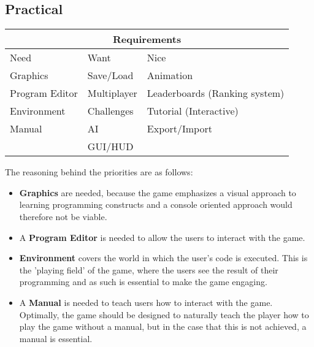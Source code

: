 \subsection*{Practical}
\begin{tabular}{|l|l|l|}
\hline
\multicolumn{3}{|c|}{Requirements}\\
\hline
Need & Want & Nice\\
\hline
Graphics & Save/Load & Animation\\
Program Editor & Multiplayer & Leaderboards (Ranking system)\\
Environment & Challenges & Tutorial (Interactive)\\
Manual & AI & Export/Import\\
 & GUI/HUD & \\
\hline
\end{tabular}\newline

The reasoning behind the priorities are as follows:

\begin{itemize}
	\item \textbf{Graphics} are needed, because the game emphasizes a visual approach to learning programming constructs and a console oriented approach would therefore not be viable.
	\item A \textbf{Program Editor} is needed to allow the users to interact with the game.
	\item \textbf{Environment} covers the world in which the user's code is executed.
	This is the 'playing field' of the game, where the users see the result of their programming and as such is essential to make the game engaging.
	\item A \textbf{Manual} is needed to teach users how to interact with the game.
	Optimally, the game should be designed to naturally teach the player how to play the game without a manual, but in the case that this is not achieved, a manual is essential.
\end{itemize}

